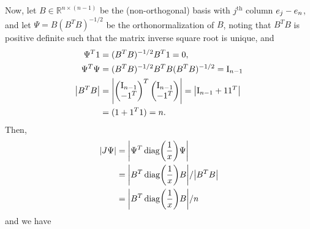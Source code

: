 Now, let $B \in \mathbb{R}^{n \times (n-1)}$ be the (non-orthogonal) basis with $j^\text{th}$ column $e_j - e_n$, and let $\Psi = B (B^T B)^{-1/2}$ be the orthonormalization of $B$, noting that $B^T B$ is positive definite such that the matrix inverse square root is unique, and
\begin{align*}
    \Psi^T \mathrm{1}    & = (B^T B)^{-1/2} B^T \mathrm{1} = \mathrm{0},                                                                    \\
    \Psi^T \Psi    & = (B^T B)^{-1/2} B^T B (B^T B)^{-1/2} = \mathrm{I}_{n-1}                                                     \\
    \left\lvert B^T B\right\rvert & = \left\lvert\begin{pmatrix} \mathrm{I}_{n-1} \\ -\mathrm{1}^T \end{pmatrix}^T \begin{pmatrix} \mathrm{I}_{n-1} \\ -\mathrm{1}^T \end{pmatrix}\right\rvert = \left\lvert\mathrm{I}_{n-1} + \mathrm{1} \mathrm{1}^T\right\rvert \\
                   & = (1 + \mathrm{1}^T \mathrm{1}) = n.
\end{align*}
Then,
\begin{align*}
    \AbsDet{J\Psi} & = \AbsDet{\Psi^T \Diag{\frac{1}{x}} \Psi}            \\
                   & = \AbsDet{B^T \Diag{\frac{1}{x}} B} / \AbsDet{B^T B} \\
                   & = \AbsDet{B^T \Diag{\frac{1}{x}} B} / n
\end{align*}
and we have
